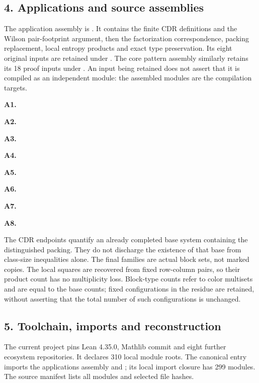 \documentclass[english,11pt,a4paper]{article}
\begin{document}
\subsection{4. Applications and source assemblies}\label{applications-and-source-assemblies}

The application assembly is . It contains the finite CDR definitions and the Wilson pair-footprint argument, then the factorization correspondence, packing replacement, local entropy products and exact type preservation. Its eight original inputs are retained under . The core pattern assembly similarly retains its 18 proof inputs under . An input being retained does not assert that it is compiled as an independent module: the assembled modules are the compilation targets.

\textbf{A1.} 

\textbf{A2.} 

\textbf{A3.} 

\textbf{A4.} 

\textbf{A5.} 

\textbf{A6.} 

\textbf{A7.} 

\textbf{A8.} 

The CDR endpoints quantify an already completed base system containing the distinguished packing. They do not discharge the existence of that base from class-size inequalities alone. The final families are actual block sets, not marked copies. The local squares are recovered from fixed row-column pairs, so their product count has no multiplicity loss. Block-type counts refer to color multisets and are equal to the base counts; fixed configurations in the residue are retained, without asserting that the total number of such configurations is unchanged.

\subsection{5. Toolchain, imports and reconstruction}\label{toolchain-imports-and-reconstruction}

The current project pins Lean 4.35.0, Mathlib commit  and eight further ecosystem repositories. It declares 310 local module roots. The canonical entry  imports the applications assembly and ; its local import closure has 299 modules. The source manifest lists all modules and selected file hashes.
\end{document}
